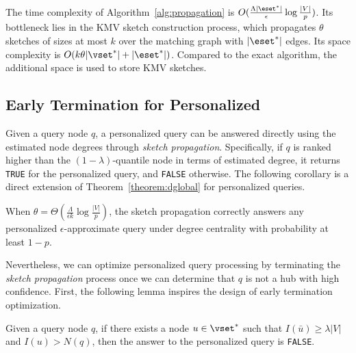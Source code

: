 The time complexity of Algorithm~\ref{alg:propagation} is $O(\frac{\Lambda |\eset^*|}{\epsilon}\log{\frac{|V|}{p}})$.
Its bottleneck lies in the KMV sketch construction process, which propagates $\theta$ sketches of sizes at most $k$ over the matching graph with $|\eset^*|$ edges.
Its space complexity is $O(k\theta|\vset^*| + |\eset^*|)$. Compared to the exact algorithm, the additional space is used to store KMV sketches.

\subsection{Early Termination for Personalized \ced}
\label{sec:degree-personal}

Given a query node $q$, a personalized \ced query can be answered directly using the estimated node degrees through \emph{sketch propagation}.
Specifically, if $q$ is ranked higher than the $(1-\lambda)$-quantile node in terms of estimated degree, it returns \texttt{TRUE} for the personalized query, and \texttt{FALSE} otherwise.
The following corollary is a direct extension of Theorem~\ref{theorem:dglobal} for personalized queries.

\begin{corollary}
  When $\theta = \Theta(\frac{\Lambda}{\epsilon k}\log{\frac{|V|}{p}})$, the sketch propagation correctly answers any personalized $\epsilon$-approximate \ced query under degree centrality with probability at least $1 - p$.
\end{corollary}

Nevertheless, we can optimize personalized \ced query processing by terminating the \emph{sketch propagation} process once we can determine that $q$ is not a hub with high confidence.
First, the following lemma inspires the design of early termination optimization.
\begin{lemma}\label{lemma:earlyterm}
  Given a query node $q$, if there exists a node $u \in \vset^*$ such that $I(\bar{u}) \geq \lambda |V|$ and $I(u) > N(q)$, then the answer to the personalized \ced query is \texttt{FALSE}.
\end{lemma}

